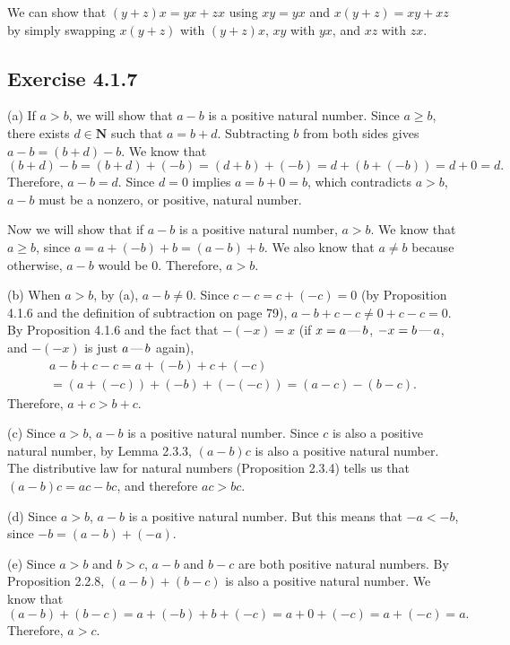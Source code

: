 \documentclass[12pt, oneside]{book}
\newcommand{\formalminus}{\, \text{\textemdash} \,}
\begin{document}
	We can show that $(y + z)x = yx + zx$ using $xy = yx$ and $x(y + z) = xy + xz$ by simply swapping $x(y + z)$ with $(y + z)x$, $xy$ with $yx$, and $xz$ with $zx$.
	
	\subsection*{Exercise 4.1.7}
	
	\noindent (a) If $a > b$, we will show that $a - b$ is a positive natural number. Since $a \ge b$, there exists $d \in \mathbf{N}$ such that $a = b + d$. Subtracting $b$ from both sides gives $a - b = (b + d) - b$. We know that \[(b + d) - b = (b + d) + (-b) = (d + b) + (-b) = d + (b + (-b)) = d + 0 = d.\] Therefore, $a - b = d$. Since $d = 0$ implies $a = b + 0 = b$, which contradicts $a > b$, $a - b$ must be a nonzero, or positive, natural number.
	
	Now we will show that if $a - b$ is a positive natural number, $a > b$. We know that $a \ge b$, since $a = a + (-b) + b = (a - b) + b$. We also know that $a \ne b$ because otherwise, $a - b$ would be $0$. Therefore, $a > b$.
	
	\bigskip
	\noindent (b) When $a > b$, by (a), $a - b \ne 0$. Since $c - c = c + (-c) = 0$ (by Proposition 4.1.6 and the definition of subtraction on page 79), $a - b + c - c \ne 0 + c - c = 0$. By Proposition 4.1.6 and the fact that $-(-x) = x$ (if $x = a \formalminus b$, $-x = b \formalminus a$, and $-(-x)$ is just $a \formalminus b$ again),
	\begin{multline*} a - b + c - c = a + (-b) + c + (-c) \\ = (a + (-c)) + (-b) + (-(-c)) = (a - c) - (b - c). \end{multline*}
	Therefore, $a + c > b + c$.
	
	\bigskip
	\noindent (c) Since $a > b$, $a - b$ is a positive natural number. Since $c$ is also a positive natural number, by Lemma 2.3.3, $(a - b)c$ is also a positive natural number. The distributive law for natural numbers (Proposition 2.3.4) tells us that $(a - b)c = ac - bc$, and therefore $ac > bc$.
	
	\bigskip
	\noindent (d) Since $a > b$, $a - b$ is a positive natural number. But this means that $-a < -b$, since $-b = (a - b) + (-a)$.
	
	\bigskip
	\noindent (e) Since $a > b$ and $b > c$, $a - b$ and $b - c$ are both positive natural numbers. By Proposition 2.2.8, $(a - b) + (b - c)$ is also a positive natural number. We know that \[(a - b) + (b - c) = a + (-b) + b + (-c) = a + 0 + (-c) = a + (-c) = a.\] Therefore, $a > c$.
	
\end{document}
